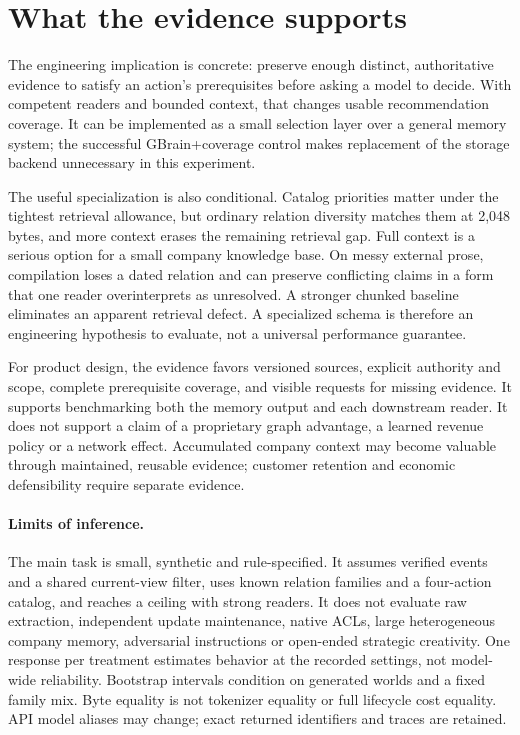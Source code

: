 \section{What the evidence supports}
The engineering implication is concrete: preserve enough distinct, authoritative evidence to satisfy an action's prerequisites before asking a model to decide. With competent readers and bounded context, that changes usable recommendation coverage. It can be implemented as a small selection layer over a general memory system; the successful GBrain+coverage control makes replacement of the storage backend unnecessary in this experiment.

The useful specialization is also conditional. Catalog priorities matter under the tightest retrieval allowance, but ordinary relation diversity matches them at 2,048 bytes, and more context erases the remaining retrieval gap. Full context is a serious option for a small company knowledge base. On messy external prose, compilation loses a dated relation and can preserve conflicting claims in a form that one reader overinterprets as unresolved. A stronger chunked baseline eliminates an apparent retrieval defect. A specialized schema is therefore an engineering hypothesis to evaluate, not a universal performance guarantee.

For product design, the evidence favors versioned sources, explicit authority and scope, complete prerequisite coverage, and visible requests for missing evidence. It supports benchmarking both the memory output and each downstream reader. It does not support a claim of a proprietary graph advantage, a learned revenue policy or a network effect. Accumulated company context may become valuable through maintained, reusable evidence; customer retention and economic defensibility require separate evidence.

\paragraph{Limits of inference.}
The main task is small, synthetic and rule-specified. It assumes verified events and a shared current-view filter, uses known relation families and a four-action catalog, and reaches a ceiling with strong readers. It does not evaluate raw extraction, independent update maintenance, native ACLs, large heterogeneous company memory, adversarial instructions or open-ended strategic creativity. One response per treatment estimates behavior at the recorded settings, not model-wide reliability. Bootstrap intervals condition on generated worlds and a fixed family mix. Byte equality is not tokenizer equality or full lifecycle cost equality. API model aliases may change; exact returned identifiers and traces are retained.

